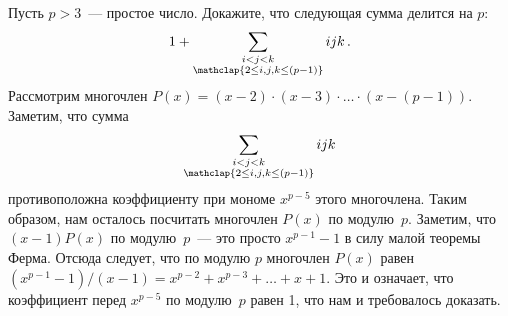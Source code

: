 \problem{}
Пусть $p > 3$~--- простое число.
Докажите, что следующая сумма делится на $p$:
\[
    1 +
    \sum_{\substack{
        i < j < k \\
        \mathclap{2 \leq i, j, k \leq (p - 1)}
    }}
        i j k
\, . \]
\solution
Рассмотрим многочлен $P(x) = (x - 2) \cdot (x - 3) \cdot \ldots \cdot (x - (p - 1))$.
Заметим, что сумма
\[
    \sum_{\substack{
        i < j < k \\
        \mathclap{2 \leq i, j, k \leq (p - 1)}
    }}
        i j k
\]
противоположна коэффициенту при мономе $x^{p-5}$ этого многочлена.
Таким образом, нам осталось посчитать многочлен $P(x)$ по модулю~$p$.
Заметим, что $(x - 1) P(x)$ по модулю~$p$~--- это просто $x^{p-1} - 1$ в силу
малой теоремы Ферма.
Отсюда следует, что по модулю $p$ многочлен $P(x)$ равен
$(x^{p-1} - 1)/(x - 1) = x^{p-2} + x^{p-3} + \ldots + x + 1$.
Это и означает, что коэффициент перед $x^{p-5}$ по модулю~$p$ равен 1, что нам
и требовалось доказать.
\endproblem

